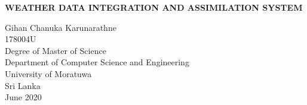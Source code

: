 \documentclass[a4paper,oneside,12pt]{report}
\begin{document}
\begin{titlepage}
    \begin{center}
        \Large{
        \textbf{WEATHER DATA INTEGRATION AND ASSIMILATION SYSTEM}}\\
        \vspace{144pt}
  \large      
       
        
        
        Gihan Chanuka Karunarathne\\
        \vspace{24pt}
      178004U\\
         \vspace{72pt}
        Degree of Master of Science\\
       
        
       \vspace{72pt}
        \large
        Department of Computer Science and Engineering\\
        \vspace{24pt}
        University of Moratuwa\\
        Sri Lanka\\
        \vspace{32pt}
        June 2020
        
    \end{center}
\end{titlepage}
\end{document}
